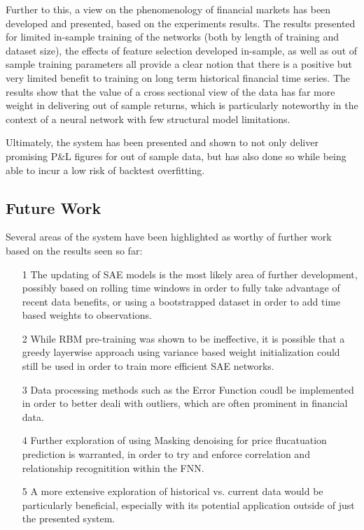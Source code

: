 \documentclass[a4paper,11pt,oneside]{article}
\theoremstyle{plain}
\theoremstyle{definition}
\begin{document}
Further to this, a view on the phenomenology of financial markets has been developed and presented, based on the experiments results. The results presented for limited in-sample training of the networks (both by length of training and dataset size), the effects of feature selection developed in-sample, as well as out of sample training parameters all provide a clear notion that there is a positive but very limited benefit to training on long term historical financial time series. The results show that the value of a cross sectional view of the data has far more weight in delivering out of sample returns, which is particularly noteworthy in the context of a neural network with few structural model limitations. \newline 

Ultimately, the system has been presented and shown to not only deliver promising P\&L figures for out of sample data, but has also done so while being able to incur a low risk of backtest overfitting.

\subsection{Future Work}

Several areas of the system have been highlighted as worthy of further work based on the results seen so far: 
\begin{itemize}
	\item [1] The updating of SAE models is the most likely area of further development, possibly based on rolling time windows in order to fully take advantage of recent data benefits, or using a bootstrapped dataset in order to add time based weights to observations.
	\item [2] While RBM pre-training was shown to be ineffective, it is possible that a greedy layerwise approach using variance based weight initialization could still be used in order to train more efficient SAE networks.
	\item [3] Data processing methods such as the Error Function coudl be implemented in order to better deali with outliers, which are often prominent in financial data.
	\item [4] Further exploration of using Masking denoising for price flucatuation prediction is warranted, in order to try and enforce correlation and relationship recognitition within the FNN.
	\item [5] A more extensive exploration of historical vs. current data would be particularly beneficial, especially with its potential application outside of just the presented system.
\end{itemize}
\end{document}
